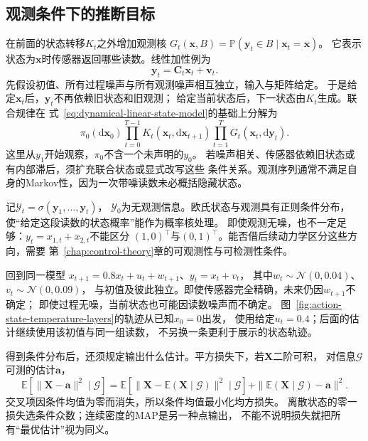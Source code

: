 \subsection{观测条件下的推断目标}
在前面的状态转移$K_t$之外增加观测核
$G_t(\bm x,B)=\mathbb P(\bm y_t\in B\mid\bm x_t=\bm x)$。
它表示状态为$\bm x$时传感器返回哪些读数。线性加性例为
\begin{equation}
  \bm y_t=\bm C_t\bm x_t+\bm v_t.
  \label{eq:dynamical-linear-observation-model}
\end{equation}
先假设初值、所有过程噪声与所有观测噪声相互独立，输入与矩阵给定。
于是给定$\bm x_t$后，$\bm y_t$不再依赖旧状态和旧观测；
给定当前状态后，下一状态由$K_t$生成。联合规律在
式~\eqref{eq:dynamical-linear-state-model}的基础上分解为
\[
 \pi_0(\mathrm d\bm x_0)
       \prod_{t=0}^{T-1}K_t(\bm x_t,\mathrm d\bm x_{t+1})
       \prod_{t=1}^T G_t(\bm x_t,\mathrm d\bm y_t).
\]
这里从$y_1$开始观察，$\pi_0$不含一个未声明的$y_0$。
若噪声相关、传感器依赖旧状态或有内部滞后，须扩充联合状态或显式改写这些
条件关系。观测序列通常不满足自身的Markov性，因为一次带噪读数未必概括隐藏状态。

记$\mathcal Y_t=\sigma(\bm y_1,\ldots,\bm y_t)$，
$\mathcal Y_0$为无观测信息。欧氏状态与观测具有正则条件分布，
使“给定这段读数的状态概率”能作为概率核处理。
即使观测无噪，也不一定足够：$y_t=x_{1,t}+x_{2,t}$不能区分
$(1,0)^\top$与$(0,1)^\top$。能否借后续动力学区分这些方向，需要
第~\ref{chap:control-theory}章的可观测性与可检测性条件。

\begin{example}[带泄漏温度的间接观测]
 \label{ex:dynamical-noisy-temperature}
 回到同一模型
 $x_{t+1}=0.8x_t+u_t+w_{t+1}$、$y_t=x_t+v_t$，
 其中$w_t\sim\mathcal N(0,0.04)$、$v_t\sim\mathcal N(0,0.09)$，
 与初值及彼此独立。即使传感器完全精确，未来仍因$w_{t+1}$不确定；
 即使过程无噪，当前状态也可能因读数噪声而不确定。
 图~\ref{fig:action-state-temperature-layers}的轨迹从已知$x_0=0$出发，
 使用给定$u_t=0.4$；后面的估计继续使用该初值与同一组读数，
 不另换一条更利于展示的状态轨迹。
\end{example}

得到条件分布后，还须规定输出什么估计。平方损失下，若$\bm X$二阶可积，
对信息$\mathcal G$可测的估计$\bm a$，
\[
 \mathbb E[\|\bm X-\bm a\|^2\mid\mathcal G]
 =\mathbb E[\|\bm X-\mathbb E(\bm X\mid\mathcal G)\|^2\mid\mathcal G]
       +\|\mathbb E(\bm X\mid\mathcal G)-\bm a\|^2.
\]
交叉项因条件均值为零而消失，所以条件均值最小化均方损失。
离散状态的零一损失选条件众数；连续密度的MAP是另一种点输出，
不能不说明损失就把所有“最优估计”视为同义。

